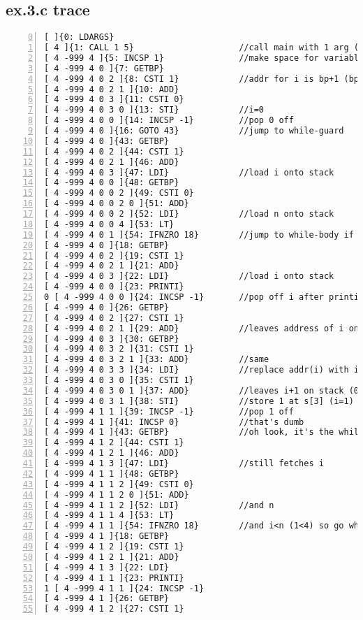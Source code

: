 \documentclass[a4paper, titlepage]{article}
\begin{document}
\subsection*{ex.3.c trace}
\begin{lstlisting}[numbers=left, firstnumber=0]
[ ]{0: LDARGS}
[ 4 ]{1: CALL 1 5}                     //call main with 1 arg (4)
[ 4 -999 4 ]{5: INCSP 1}               //make space for variable i
[ 4 -999 4 0 ]{7: GETBP}
[ 4 -999 4 0 2 ]{8: CSTI 1}            //addr for i is bp+1 (bp holds n)
[ 4 -999 4 0 2 1 ]{10: ADD}
[ 4 -999 4 0 3 ]{11: CSTI 0}
[ 4 -999 4 0 3 0 ]{13: STI}            //i=0
[ 4 -999 4 0 0 ]{14: INCSP -1}         //pop 0 off
[ 4 -999 4 0 ]{16: GOTO 43}            //jump to while-guard
[ 4 -999 4 0 ]{43: GETBP}
[ 4 -999 4 0 2 ]{44: CSTI 1}
[ 4 -999 4 0 2 1 ]{46: ADD}
[ 4 -999 4 0 3 ]{47: LDI}              //load i onto stack
[ 4 -999 4 0 0 ]{48: GETBP}
[ 4 -999 4 0 0 2 ]{49: CSTI 0}
[ 4 -999 4 0 0 2 0 ]{51: ADD}
[ 4 -999 4 0 0 2 ]{52: LDI}            //load n onto stack
[ 4 -999 4 0 0 4 ]{53: LT}
[ 4 -999 4 0 1 ]{54: IFNZRO 18}        //jump to while-body if i<n
[ 4 -999 4 0 ]{18: GETBP}
[ 4 -999 4 0 2 ]{19: CSTI 1}
[ 4 -999 4 0 2 1 ]{21: ADD}
[ 4 -999 4 0 3 ]{22: LDI}              //load i onto stack
[ 4 -999 4 0 0 ]{23: PRINTI}
0 [ 4 -999 4 0 0 ]{24: INCSP -1}       //pop off i after printing it
[ 4 -999 4 0 ]{26: GETBP}
[ 4 -999 4 0 2 ]{27: CSTI 1}
[ 4 -999 4 0 2 1 ]{29: ADD}            //leaves address of i on stack
[ 4 -999 4 0 3 ]{30: GETBP}
[ 4 -999 4 0 3 2 ]{31: CSTI 1}
[ 4 -999 4 0 3 2 1 ]{33: ADD}          //same
[ 4 -999 4 0 3 3 ]{34: LDI}            //replace addr(i) with i (s[3]=0)
[ 4 -999 4 0 3 0 ]{35: CSTI 1}
[ 4 -999 4 0 3 0 1 ]{37: ADD}          //leaves i+1 on stack (0+1=1)
[ 4 -999 4 0 3 1 ]{38: STI}            //store 1 at s[3] (i=1)
[ 4 -999 4 1 1 ]{39: INCSP -1}         //pop 1 off
[ 4 -999 4 1 ]{41: INCSP 0}            //that's dumb
[ 4 -999 4 1 ]{43: GETBP}              //oh look, it's the while-guard again!
[ 4 -999 4 1 2 ]{44: CSTI 1}
[ 4 -999 4 1 2 1 ]{46: ADD}
[ 4 -999 4 1 3 ]{47: LDI}              //still fetches i
[ 4 -999 4 1 1 ]{48: GETBP}
[ 4 -999 4 1 1 2 ]{49: CSTI 0}
[ 4 -999 4 1 1 2 0 ]{51: ADD}
[ 4 -999 4 1 1 2 ]{52: LDI}            //and n
[ 4 -999 4 1 1 4 ]{53: LT}
[ 4 -999 4 1 1 ]{54: IFNZRO 18}        //and i<n (1<4) so go while-body!
[ 4 -999 4 1 ]{18: GETBP}
[ 4 -999 4 1 2 ]{19: CSTI 1}
[ 4 -999 4 1 2 1 ]{21: ADD}
[ 4 -999 4 1 3 ]{22: LDI}
[ 4 -999 4 1 1 ]{23: PRINTI}
1 [ 4 -999 4 1 1 ]{24: INCSP -1}
[ 4 -999 4 1 ]{26: GETBP}
[ 4 -999 4 1 2 ]{27: CSTI 1}

\end{lstlisting}
\end{document}
